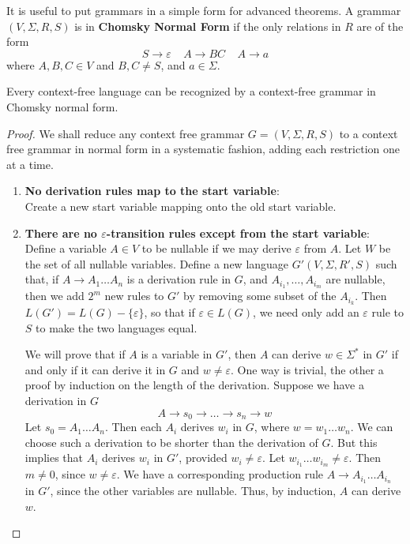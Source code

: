 It is useful to put grammars in a simple form for advanced theorems. A grammar $(V,\Sigma,R,S)$ is in {\bf Chomsky Normal Form} if the only relations in $R$ are of the form
%
\[ S \rightarrow \varepsilon\ \ \ \ \ A \rightarrow BC\ \ \ \ \ A \rightarrow a \]
%
where $A,B,C \in V$ and $B,C \neq S$, and $a \in \Sigma$.

\begin{theorem}
    Every context-free language can be recognized by a context-free grammar in Chomsky normal form.
\end{theorem}
\begin{proof}
    We shall reduce any context free grammar $G = (V,\Sigma,R,S)$ to a context free grammar in normal form in a systematic fashion, adding each restriction one at a time.

    \begin{enumerate}
        \item {\bf No derivation rules map to the start variable}:\\
        Create a new start variable mapping onto the old start variable.

        \item {\bf There are no $\varepsilon$-transition rules except from the start variable}:\\
        Define a variable $A \in V$ to be nullable if we may derive $\varepsilon$ from $A$. Let $W$ be the set of all nullable variables. Define a new language $G'(V,\Sigma,R',S)$ such that, if $A \rightarrow A_1 \dots A_n$ is a derivation rule in $G$, and $A_{i_1}, \dots, A_{i_m}$ are nullable, then we add $2^m$ new rules to $G'$ by removing some subset of the $A_{i_k}$. Then $L(G') = L(G) - \{ \varepsilon \}$, so that if $\varepsilon \in L(G)$, we need only add an $\varepsilon$ rule to $S$ to make the two languages equal.

        We will prove that if $A$ is a variable in $G'$, then $A$ can derive $w \in \Sigma^*$ in $G'$ if and only if it can derive it in $G$ and $w \neq \varepsilon$. One way is trivial, the other a proof by induction on the length of the derivation. Suppose we have a derivation in $G$
        \[ A \rightarrow s_0 \rightarrow \dots \rightarrow s_n \rightarrow w \]
        Let $s_0 = A_1 \dots A_n$. Then each $A_i$ derives $w_i$ in $G$, where $w = w_1 \dots w_n$. We can choose such a derivation to be shorter than the derivation of $G$. But this implies that $A_i$ derives $w_i$ in $G'$, provided $w_i \neq \varepsilon$. Let $w_{i_1} \dots w_{i_m} \neq \varepsilon$. Then $m \neq 0$, since $w \neq \varepsilon$. We have a corresponding production rule $A \rightarrow A_{i_1} \dots A_{i_n}$ in $G'$, since the other variables are nullable. Thus, by induction, $A$ can derive $w$.


\end{enumerate}
\end{proof}
